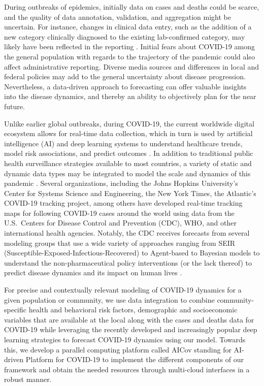 \documentclass[letterpaper, inpress]{jds} %
\renewcommand{\_}{%
    \textunderscore\hspace{0pt}%
}
\begin{document}
During outbreaks of epidemics, initially data on cases and deaths
could be scarce, and the quality of data annotation, validation, and
aggregation might be uncertain. For instance, changes in clinical data
entry, such as the addition of a new category clinically diagnosed to
the existing lab-confirmed category, may likely have been reflected in
the reporting \citep{Petropoulos2020-hh}. Initial fears about COVID-19
among the general population with regards to the trajectory of the
pandemic could also affect administrative reporting. Diverse media
sources and differences in local and federal policies may add to the
general uncertainty about disease progression. Nevertheless, a
data-driven approach to forecasting can offer valuable insights into
the disease dynamics, and thereby an ability to objectively plan for
the near future.

Unlike earlier global outbreaks, during COVID-19, the current
worldwide digital ecosystem allows for real-time data collection,
which in turn is used by artificial intelligence (AI) and deep
learning systems to understand healthcare trends, model risk
associations, and predict outcomes \citep{Ting2020-lw}.  In addition to
traditional public health surveillance strategies available to most
countries, a variety of static and dynamic data types may be
integrated to model the scale and dynamics of this pandemic
\citep{Pyne2015-ao}. Several organizations, including the Johns Hopkins
University’s Center for Systems Science and Engineering, the New York
Times, the Atlantic’s COVID-19 tracking project, among others have
developed real-time tracking maps for following COVID-19 cases around
the world using data from the U.S.~Centers for Disease Control and
Prevention (CDC), WHO, and other international health
agencies. Notably, the CDC receives forecasts from several modeling
groups that use a wide variety of approaches ranging from SEIR
(Susceptible-Exposed-Infectious-Recovered) to Agent-based to Bayesian
models to understand the non-pharmaceutical policy interventions (or
the lack thereof) to predict disease dynamics and its impact on human
lives \citep{www-cdc-modeling-forecast}.

For precise and contextually relevant modeling of COVID-19 dynamics
for a given population or community, we use data integration to
combine community-specific health and behavioral risk factors,
demographic and socioeconomic variables that are available at the
local along with the cases and deaths data for COVID-19 while
leveraging the recently developed and increasingly popular deep
learning strategies to forecast COVID-19 dynamics using our
model. Towards this, we develop a parallel computing platform called
AICov standing for AI-driven Platform for COVID-19 to implement the
different components of our framework and obtain the needed resources
through multi-cloud interfaces in a robust manner.
\end{document}
